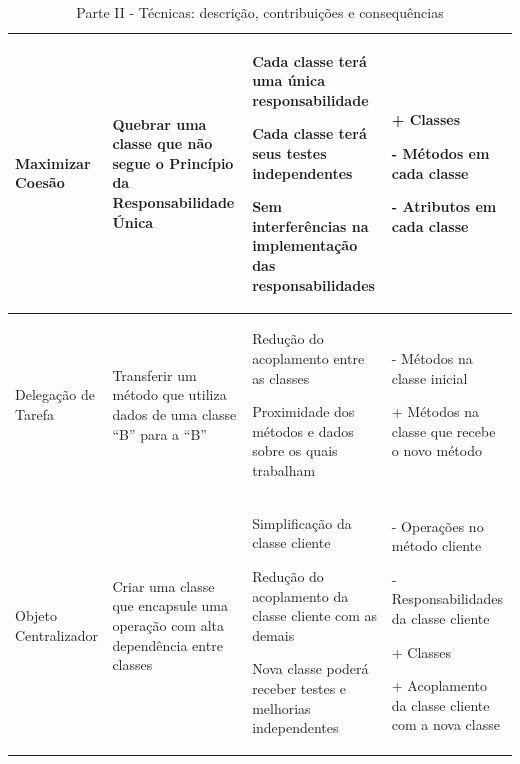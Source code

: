 \begin{landscape}
\begin{table}[hbt]
\begin{tabular}{|p{3.5cm}|p{5cm}|p{8.5cm}|p{7.2cm}|}
\hline
Maximizar Coesão
& Quebrar uma classe que não segue o Princípio da Responsabilidade Única
& \begin{my_itemize}
	\item Cada classe terá uma única responsabilidade
	\item Cada classe terá seus testes independentes
	\item Sem interferências na implementação das responsabilidades
  \end{my_itemize}
& \begin{my_itemize}
	\item[+] Classes
	\item[-] Métodos em cada classe
	\item[-] Atributos em cada classe
  \end{my_itemize}
\tabularnewline

\hline
Delegação de Tarefa
& Transferir um método que utiliza dados de uma classe ``B'' para a ``B'' 
& \begin{my_itemize}
	\item Redução do acoplamento entre as classes
	\item Proximidade dos métodos e dados sobre os quais trabalham
  \end{my_itemize}
& \begin{my_itemize}
	\item[-] Métodos na classe inicial
	\item[+] Métodos na classe que recebe o novo método
  \end{my_itemize}
\tabularnewline

\hline
Objeto Centralizador
& Criar uma classe que encapsule uma operação com alta dependência entre classes
& \begin{my_itemize}
	\item Simplificação da classe cliente
	\item Redução do acoplamento da classe cliente com as demais
	\item Nova classe poderá receber testes e melhorias independentes
  \end{my_itemize}
& \begin{my_itemize}
	\item[-] Operações no método cliente
	\item[-] Responsabilidades da classe cliente
	\item[+] Classes
	\item[+] Acoplamento da classe cliente com a nova classe
  \end{my_itemize}
\tabularnewline
\hline
\end{tabular}

\caption{Parte II - Técnicas: descrição, contribuições e consequências}
\end{table}

\end{landscape}

